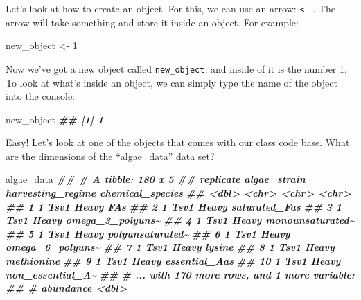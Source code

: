 \documentclass[
]{krantz}
\newenvironment{Shaded}{\begin{snugshade}}{\end{snugshade}}
\newcommand{\DecValTok}[1]{\textcolor[rgb]{0.00,0.00,0.81}{#1}}
\newcommand{\DocumentationTok}[1]{\textcolor[rgb]{0.56,0.35,0.01}{\textbf{\textit{#1}}}}
\newcommand{\NormalTok}[1]{#1}
\newcommand{\OtherTok}[1]{\textcolor[rgb]{0.56,0.35,0.01}{#1}}
\begin{document}
Let's look at how to create an object. For this, we can use an arrow: \texttt{\textless{}-} . The arrow will take something and store it inside an object. For example:

\begin{Shaded}
\begin{Highlighting}[]
\NormalTok{new\_object }\OtherTok{\textless{}{-}} \DecValTok{1}
\end{Highlighting}
\end{Shaded}

Now we've got a new object called \texttt{new\_object}, and inside of it is the number 1. To look at what's inside an object, we can simply type the name of the object into the console:

\begin{Shaded}
\begin{Highlighting}[]
\NormalTok{new\_object}
\DocumentationTok{\#\# [1] 1}
\end{Highlighting}
\end{Shaded}

Easy! Let's look at one of the objects that comes with our class code base. What are the dimensions of the ``algae\_data'' data set?

\begin{Shaded}
\begin{Highlighting}[]
\NormalTok{algae\_data}
\DocumentationTok{\#\# \# A tibble: 180 x 5}
\DocumentationTok{\#\#    replicate algae\_strain harvesting\_regime chemical\_species}
\DocumentationTok{\#\#        \textless{}dbl\textgreater{} \textless{}chr\textgreater{}        \textless{}chr\textgreater{}             \textless{}chr\textgreater{}           }
\DocumentationTok{\#\#  1         1 Tsv1         Heavy             FAs             }
\DocumentationTok{\#\#  2         1 Tsv1         Heavy             saturated\_Fas   }
\DocumentationTok{\#\#  3         1 Tsv1         Heavy             omega\_3\_polyuns\textasciitilde{}}
\DocumentationTok{\#\#  4         1 Tsv1         Heavy             monounsaturated\textasciitilde{}}
\DocumentationTok{\#\#  5         1 Tsv1         Heavy             polyunsaturated\textasciitilde{}}
\DocumentationTok{\#\#  6         1 Tsv1         Heavy             omega\_6\_polyuns\textasciitilde{}}
\DocumentationTok{\#\#  7         1 Tsv1         Heavy             lysine          }
\DocumentationTok{\#\#  8         1 Tsv1         Heavy             methionine      }
\DocumentationTok{\#\#  9         1 Tsv1         Heavy             essential\_Aas   }
\DocumentationTok{\#\# 10         1 Tsv1         Heavy             non\_essential\_A\textasciitilde{}}
\DocumentationTok{\#\# \# ... with 170 more rows, and 1 more variable:}
\DocumentationTok{\#\# \#   abundance \textless{}dbl\textgreater{}}
\end{Highlighting}
\end{Shaded}
\end{document}
